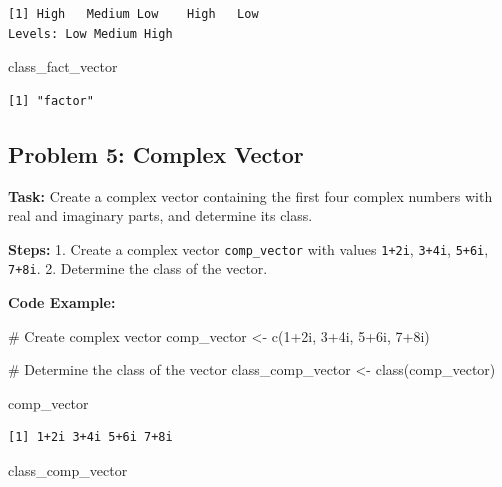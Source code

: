 \documentclass[
  letterpaper,
  DIV=11,
  numbers=noendperiod]{scrreprt}
\newenvironment{Shaded}{\begin{snugshade}}{\end{snugshade}}
\newcommand{\CommentTok}[1]{\textcolor[rgb]{0.37,0.37,0.37}{#1}}
\newcommand{\DecValTok}[1]{\textcolor[rgb]{0.68,0.00,0.00}{#1}}
\newcommand{\FunctionTok}[1]{\textcolor[rgb]{0.28,0.35,0.67}{#1}}
\newcommand{\NormalTok}[1]{\textcolor[rgb]{0.00,0.23,0.31}{#1}}
\newcommand{\OtherTok}[1]{\textcolor[rgb]{0.00,0.23,0.31}{#1}}
\newcommand{\SpecialCharTok}[1]{\textcolor[rgb]{0.37,0.37,0.37}{#1}}
\begin{document}
\begin{verbatim}
[1] High   Medium Low    High   Low   
Levels: Low Medium High
\end{verbatim}

\begin{Shaded}
\begin{Highlighting}[]
\NormalTok{class\_fact\_vector}
\end{Highlighting}
\end{Shaded}

\begin{verbatim}
[1] "factor"
\end{verbatim}

\subsection*{Problem 5: Complex Vector}\label{problem-5-complex-vector}

\textbf{Task:} Create a complex vector containing the first four complex
numbers with real and imaginary parts, and determine its class.

\textbf{Steps:} 1. Create a complex vector \texttt{comp\_vector} with
values \texttt{1+2i}, \texttt{3+4i}, \texttt{5+6i}, \texttt{7+8i}. 2.
Determine the class of the vector.

\textbf{Code Example:}

\begin{Shaded}
\begin{Highlighting}[]
\CommentTok{\# Create complex vector}
\NormalTok{comp\_vector }\OtherTok{\textless{}{-}} \FunctionTok{c}\NormalTok{(}\DecValTok{1}\SpecialCharTok{+}\DecValTok{2}\NormalTok{i, }\DecValTok{3}\SpecialCharTok{+}\DecValTok{4}\NormalTok{i, }\DecValTok{5}\SpecialCharTok{+}\DecValTok{6}\NormalTok{i, }\DecValTok{7}\SpecialCharTok{+}\DecValTok{8}\NormalTok{i)}

\CommentTok{\# Determine the class of the vector}
\NormalTok{class\_comp\_vector }\OtherTok{\textless{}{-}} \FunctionTok{class}\NormalTok{(comp\_vector)}

\NormalTok{comp\_vector}
\end{Highlighting}
\end{Shaded}

\begin{verbatim}
[1] 1+2i 3+4i 5+6i 7+8i
\end{verbatim}

\begin{Shaded}
\begin{Highlighting}[]
\NormalTok{class\_comp\_vector}
\end{Highlighting}
\end{Shaded}
\end{document}
